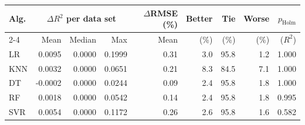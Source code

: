 \begin{tabular}{lrrrrrrrr}
\toprule
\textbf{Alg.} & \multicolumn{3}{c}{\textbf{$\Delta R^2$ per data set}} & \textbf{$\Delta$RMSE (\%)} & \textbf{Better} & \textbf{Tie} & \textbf{Worse} & \textbf{$p_{\text{Holm}}$} \\
\cmidrule(lr){2-4}
& Mean & Median & Max & Mean & (\%) & (\%) & (\%) & ($R^2$) \\
\midrule
LR & 0.0095 & 0.0000 & 0.1999 & 0.31 & 3.0 & 95.8 & 1.2 & 1.000 \\
KNN & 0.0032 & 0.0000 & 0.0651 & 0.21 & 8.3 & 84.5 & 7.1 & 1.000 \\
DT & -0.0002 & 0.0000 & 0.0244 & 0.09 & 2.4 & 95.8 & 1.8 & 1.000 \\
RF & 0.0018 & 0.0000 & 0.0542 & 0.14 & 2.4 & 95.8 & 1.8 & 0.995 \\
SVR & 0.0054 & 0.0000 & 0.1172 & 0.26 & 2.6 & 95.8 & 1.6 & 0.582 \\
\bottomrule
\end{tabular}
